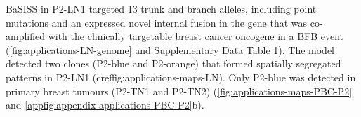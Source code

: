 
BaSISS in P2-LN1 targeted 13 trunk and branch alleles, including point mutations and an expressed novel internal fusion in the  gene that was co-amplified with the clinically targetable breast cancer oncogene  in a \acf{BFB} event (\cref{fig:applications-LN-genome} and Supplementary Data Table 1). The model detected two clones (P2-blue and P2-orange) that formed spatially segregated patterns in P2-LN1 (cref{fig:applications-maps-LN}). Only P2-blue was detected in primary breast tumours (P2-TN1 and P2-TN2) (\cref{fig:applications-maps-PBC-P2} and \cref{appfig:appendix-applications-PBC-P2}b).


